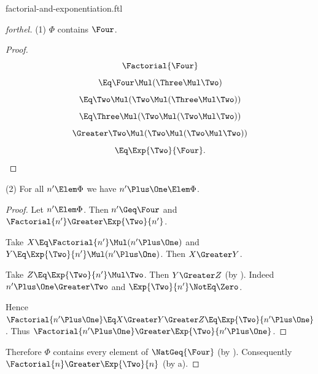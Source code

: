 \documentclass{stex}
\begin{document}
\begin{smodule}{factorial-and-exponentiation.ftl}
\begin{proof}[forthel]
  (1) $\Phi$ contains $\Four$.
  \begin{proof}
    \[  \Factorial{\Four}                                  \]
    \[    \Eq \Four \Mul (\Three \Mul \Two)             \]
    \[    \Eq \Two \Mul (\Two \Mul (\Three \Mul \Two))   \]
    \[    \Eq \Three \Mul (\Two \Mul (\Two \Mul \Two))   \]
    \[    \Greater \Two \Mul (\Two \Mul (\Two \Mul \Two))   \]
    \[    \Eq \Exp{\Two}{\Four}.                          \]
  \end{proof}

  (2) For all $n' \Elem \Phi$ we have $n' \Plus \One \Elem \Phi$.
  \begin{proof}
    Let $n' \Elem \Phi$.
    Then $n' \Geq \Four$ and $\Factorial{n'} \Greater \Exp{\Two}{n'}$.

    Take $X \Eq \Factorial{n'} \Mul (n' \Plus \One)$ and $Y \Eq \Exp{\Two}{n'} \Mul (n' \Plus \One)$.
    Then $X \Greater Y$.

    Take $Z \Eq \Exp{\Two}{n'} \Mul \Two$.
    Then $Y \Greater Z$ (by ).
    Indeed $n' \Plus \One \Greater \Two$ and $\Exp{\Two}{n'} \NotEq \Zero$.

    Hence $\Factorial{n' \Plus \One} \Eq X \Greater Y \Greater Z \Eq \Exp{\Two}{n' \Plus \One}$.
    Thus $\Factorial{n' \Plus \One} \Greater \Exp{\Two}{n' \Plus \One}$.
  \end{proof}

  Therefore $\Phi$ contains every element of $\NatGeq{\Four}$ (by ).
  Consequently $\Factorial{n} \Greater \Exp{\Two}{n}$ (by a).
\end{proof}

\end{smodule}
\end{document}
